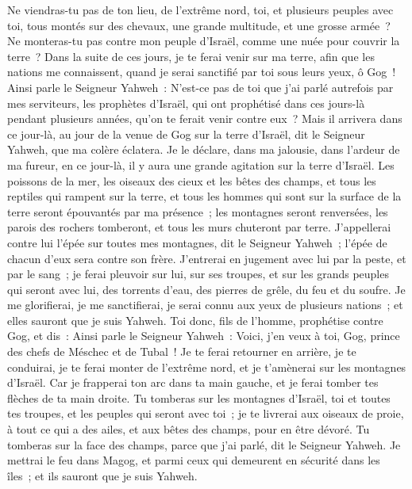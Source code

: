 \begin{multicols}{2}
Ne viendras-tu pas de ton lieu, de l'extrême nord, toi, et plusieurs peuples avec toi, tous montés sur des chevaux, une grande multitude, et une grosse armée~?
Ne monteras-tu pas contre mon peuple d'Israël, comme une nuée pour couvrir la terre~? Dans la suite de ces jours, je te ferai venir sur ma terre, afin que les nations me connaissent, quand je serai sanctifié par toi sous leurs yeux, ô Gog~!
Ainsi parle le Seigneur Yahweh~: N'est-ce pas de toi que j'ai parlé autrefois par mes serviteurs, les prophètes d'Israël, qui ont prophétisé dans ces jours-là pendant plusieurs années, qu'on te ferait venir contre eux~?
Mais il arrivera dans ce jour-là, au jour de la venue de Gog sur la terre d'Israël, dit le Seigneur Yahweh, que ma colère éclatera.
Je le déclare, dans ma jalousie, dans l'ardeur de ma fureur, en ce jour-là, il y aura une grande agitation sur la terre d'Israël.
Les poissons de la mer, les oiseaux des cieux et les bêtes des champs, et tous les reptiles qui rampent sur la terre, et tous les hommes qui sont sur la surface de la terre seront épouvantés par ma présence~; les montagnes seront renversées, les parois des rochers tomberont, et tous les murs chuteront par terre.
J'appellerai contre lui l'épée sur toutes mes montagnes, dit le Seigneur Yahweh~; l'épée de chacun d'eux sera contre son frère.
J'entrerai en jugement avec lui par la peste, et par le sang~; je ferai pleuvoir sur lui, sur ses troupes, et sur les grands peuples qui seront avec lui, des torrents d'eau, des pierres de grêle, du feu et du soufre.
Je me glorifierai, je me sanctifierai, je serai connu aux yeux de plusieurs nations~; et elles sauront que je suis Yahweh.
\VerseOne{}Toi donc, fils de l'homme, prophétise contre Gog, et dis~: Ainsi parle le Seigneur Yahweh~: Voici, j'en veux à toi, Gog, prince des chefs de Méschec et de Tubal~!
Je te ferai retourner en arrière, je te conduirai, je te ferai monter de l'extrême nord, et je t'amènerai sur les montagnes d'Israël.
Car je frapperai ton arc dans ta main gauche, et je ferai tomber tes flèches de ta main droite.
Tu tomberas sur les montagnes d'Israël, toi et toutes tes troupes, et les peuples qui seront avec toi~; je te livrerai aux oiseaux de proie, à tout ce qui a des ailes, et aux bêtes des champs, pour en être dévoré.
Tu tomberas sur la face des champs, parce que j'ai parlé, dit le Seigneur Yahweh.
Je mettrai le feu dans Magog, et parmi ceux qui demeurent en sécurité dans les îles~; et ils sauront que je suis Yahweh.

\end{multicols}
